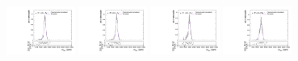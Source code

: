 \begin{figure}[htpb]
  \centering
  \includegraphics[width=0.2\textwidth]{fig/2Dfit/templateVsReco_WprToWZ2000_r0_MVV_mu_HP_nobb_LDy_linear.pdf}
  \includegraphics[width=0.2\textwidth]{fig/2Dfit/templateVsReco_WprToWZ2000_r0_MVV_mu_LP_nobb_LDy_linear.pdf}
  \includegraphics[width=0.2\textwidth]{fig/2Dfit/templateVsReco_WprToWZ2000_r0_MVV_mu_HP_nobb_HDy_linear.pdf}
  \includegraphics[width=0.2\textwidth]{fig/2Dfit/templateVsReco_WprToWZ2000_r0_MVV_mu_LP_nobb_HDy_linear.pdf}\\

\end{figure}
